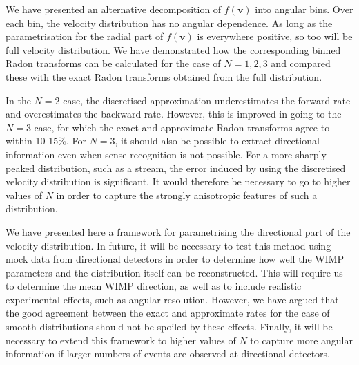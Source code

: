 We have presented an alternative decomposition of $f(\textbf{v})$ into angular bins. Over each bin, the velocity distribution has no angular dependence. As long as the parametrisation for the radial part of $f(\mathbf{v})$ is everywhere positive, so too will be full velocity distribution. We have demonstrated how the corresponding binned Radon transforms can be calculated for the case of $N=1,2,3$ and compared these with the exact Radon transforms obtained from the full distribution.

In the $N=2$ case, the discretised approximation underestimates the forward rate and overestimates the backward rate. However, this is improved in going to the $N=3$ case, for which the exact and approximate Radon transforms agree to within 10-15\%. For $N=3$, it should also be possible to extract directional information even when sense recognition is not possible. For a more sharply peaked distribution, such as a stream, the error induced by using the discretised velocity distribution is significant. It would therefore be necessary to go to higher values of $N$ in order to capture the strongly anisotropic features of such a distribution.

We have presented here a framework for parametrising the directional part of the velocity distribution. In future, it will be necessary to test this method using mock data from directional detectors in order to determine how well the WIMP parameters and the distribution itself can be reconstructed. This will require us to determine the mean WIMP direction, as well as to include realistic experimental effects, such as angular resolution. However, we have argued that the good agreement between the exact and approximate rates for the case of smooth distributions should not be spoiled by these effects. Finally, it will be necessary to extend this framework to higher values of $N$ to capture more angular information if larger numbers of events are observed at directional detectors.


